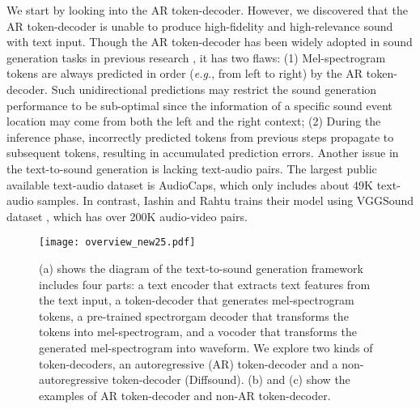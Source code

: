 \documentclass[lettersize,journal]{IEEEtran}
\begin{document}
We start by looking into the AR token-decoder. However, we discovered that the AR token-decoder is unable to produce high-fidelity and high-relevance sound with text input. {\color{black}Though the AR token-decoder has been widely adopted} in sound generation tasks in previous research \cite{liu2021conditional,iashin2021taming}, it has two flaws: (1) Mel-spectrogram tokens are always predicted in order (\textit{e.g.}, from left to right) by the AR token-decoder. 
{\color{black} Such unidirectional predictions may restrict the sound generation performance to be sub-optimal since the information of a specific sound event location may come from both the left and the right context;}
(2) During the inference phase, incorrectly predicted tokens from previous steps propagate to subsequent tokens, resulting in accumulated prediction errors. Another issue in the text-to-sound generation is lacking text-audio pairs. The largest public available text-audio dataset is AudioCaps\cite{kim2019audiocaps}, which only includes about 49K text-audio samples. In contrast, Iashin and Rahtu \cite{iashin2021taming} trains their model using VGGSound dataset \cite{chen2020vggsound}, which has over 200K audio-video pairs.
\begin{figure}[t]
  \centering
  \texttt{[image: overview\_new25.pdf]}
  \caption{(a) shows the diagram of the text-to-sound generation framework includes four parts: a text encoder that extracts text features from the text input, a token-decoder that generates mel-spectrogram tokens, a pre-trained spectrorgam decoder that transforms the tokens into mel-spectrogram, and a vocoder that transforms the generated mel-spectrogram into waveform. We explore two kinds of token-decoders, an autoregressive (AR) token-decoder and a non-autoregressive token-decoder (Diffsound). (b) and (c) show the examples of AR token-decoder and non-AR token-decoder.}
  \label{fig:1}
  \vspace*{-\baselineskip}
\end{figure}
\end{document}
